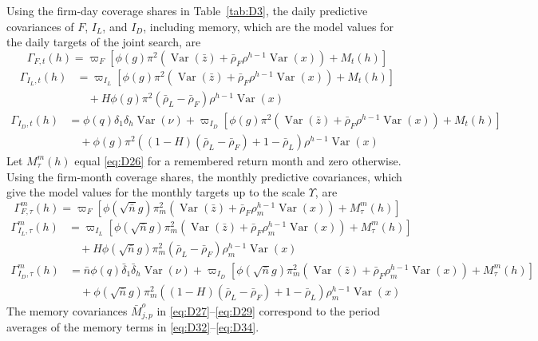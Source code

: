 \documentclass[11pt,letterpaper]{article}
\theoremstyle{remark}
\DeclareMathOperator{\Var}{Var}
\begin{document}
Using the firm-day coverage shares in Table~\ref{tab:D3}, the daily predictive covariances of $F$, $I_L$, and $I_D$, including memory, which are the model values for the daily targets of the joint search, are
\begin{equation}\label{eq:D32}
\Gamma_{F,t}(h) = \varpi_F\left[\phi(g)\pi^2\left(\Var(\bar z)+\bar\rho_F\rho^{h-1}\Var(x)\right)+M_t(h)\right]
\end{equation}
\begin{equation}\label{eq:D33}
\begin{split}
\Gamma_{I_L,t}(h) &= \varpi_{I_L}\left[\phi(g)\pi^2\left(\Var(\bar z)+\bar\rho_F\rho^{h-1}\Var(x)\right)+M_t(h)\right]\\
&\quad + H\phi(g)\pi^2(\bar\rho_L-\bar\rho_F)\rho^{h-1}\Var(x)
\end{split}
\end{equation}
\begin{equation}\label{eq:D34}
\begin{split}
\Gamma_{I_D,t}(h) &= \phi(q)\delta_1\delta_h\Var(\nu) + \varpi_{I_D}\left[\phi(g)\pi^2\left(\Var(\bar z)+\bar\rho_F\rho^{h-1}\Var(x)\right)+M_t(h)\right]\\
&\quad + \phi(g)\pi^2\left((1-H)(\bar\rho_L-\bar\rho_F)+1-\bar\rho_L\right)\rho^{h-1}\Var(x)
\end{split}
\end{equation}
Let $M^m_\tau(h)$ equal \eqref{eq:D26} for a remembered return month and zero otherwise. Using the firm-month coverage shares, the monthly predictive covariances, which give the model values for the monthly targets up to the scale $\Upsilon$, are
\begin{equation}\label{eq:D35}
\Gamma^m_{F,\tau}(h) = \varpi_F\left[\phi(\sqrt{\bar n}g)\pi_m^2\left(\Var(\bar z)+\bar\rho_F\rho_m^{h-1}\Var(x)\right)+M^m_\tau(h)\right]
\end{equation}
\begin{equation}\label{eq:D36}
\begin{split}
\Gamma^m_{I_L,\tau}(h) &= \varpi_{I_L}\left[\phi(\sqrt{\bar n}g)\pi_m^2\left(\Var(\bar z)+\bar\rho_F\rho_m^{h-1}\Var(x)\right)+M^m_\tau(h)\right]\\
&\quad + H\phi(\sqrt{\bar n}g)\pi_m^2(\bar\rho_L-\bar\rho_F)\rho_m^{h-1}\Var(x)
\end{split}
\end{equation}
\begin{equation}\label{eq:D37}
\begin{split}
\Gamma^m_{I_D,\tau}(h) &= \bar n\phi(q)\bar\delta_1\bar\delta_h\Var(\nu) + \varpi_{I_D}\left[\phi(\sqrt{\bar n}g)\pi_m^2\left(\Var(\bar z)+\bar\rho_F\rho_m^{h-1}\Var(x)\right)+M^m_\tau(h)\right]\\
&\quad + \phi(\sqrt{\bar n}g)\pi_m^2\left((1-H)(\bar\rho_L-\bar\rho_F)+1-\bar\rho_L\right)\rho_m^{h-1}\Var(x)
\end{split}
\end{equation}
The memory covariances $\bar M_{j,p}^o$ in \eqref{eq:D27}--\eqref{eq:D29} correspond to the period averages of the memory terms in \eqref{eq:D32}--\eqref{eq:D34}.
\end{document}
